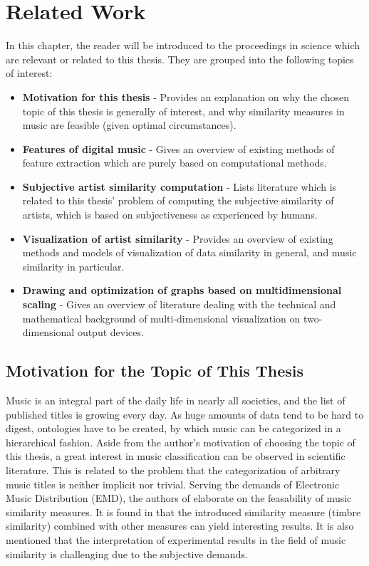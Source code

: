\section{Related Work}

In this chapter, the reader will be introduced to the proceedings in science which are
relevant or related to this thesis. They are grouped into the following topics of interest:

\begin{itemize}
	\item \textbf {Motivation for this thesis} - Provides an explanation on why the chosen 
		  topic of this thesis is generally of interest, and why similarity measures in music are feasible
		  (given optimal circumstances).
	\item \textbf {Features of digital music} - Gives an overview of existing methods of 
		  feature extraction which are purely based on computational methods.
	\item \textbf {Subjective artist similarity computation} - Lists literature which is related
		  to this thesis' problem of computing the subjective similarity of artists, which is
		  based on subjectiveness as experienced by humans.
	\item \textbf {Visualization of artist similarity} - Provides an overview of existing 
		  methods and models of visualization of data similarity in general, and music similarity
		  in particular.
	\item \textbf {Drawing and optimization of graphs based on multidimensional scaling} - Gives an
		  overview of literature dealing with the technical and mathematical background of 
		  multi-dimensional visualization on two-dimensional output devices.
\end{itemize}

\subsection{Motivation for the Topic of This Thesis}

Music is an integral part of the daily life in nearly all societies, and the list of published titles 
is growing every day. As huge amounts of data tend to be hard to digest, ontologies have to be created, 
by which music can be categorized in a hierarchical fashion. Aside from the author's motivation of 
choosing the topic of this thesis, a great interest in music classification can be observed in scientific 
literature. This is related to the problem that the categorization of arbitrary music titles
is neither implicit nor trivial.
Serving the demands of Electronic Music Distribution (EMD), the authors of \cite{pachet:02g} elaborate
on the feasability of music similarity measures. It is found in \cite{pachet:02g} that the introduced
similarity measure (timbre similarity) combined with other measures can yield interesting results. It is
also mentioned that the interpretation of experimental results in the field of music similarity is challenging
due to the subjective demands. 

